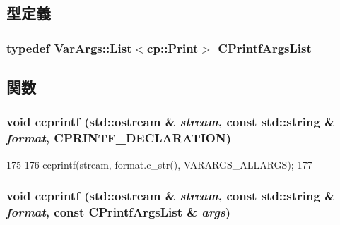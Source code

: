 \subsection{型定義}
\hypertarget{cprintf_8hh_a172a676df3b19060341a2bf04a85d39f}{
\subsubsection[{CPrintfArgsList}]{\setlength{\rightskip}{0pt plus 5cm}typedef {\bf VarArgs::List}$<${\bf cp::Print}$>$ {\bf CPrintfArgsList}}}
\label{cprintf_8hh_a172a676df3b19060341a2bf04a85d39f}


\subsection{関数}
\hypertarget{cprintf_8hh_a37efa0e15ccd2c46e909b8d16241c74a}{
\subsubsection[{ccprintf}]{\setlength{\rightskip}{0pt plus 5cm}void ccprintf (std::ostream \& {\em stream}, \/  const std::string \& {\em format}, \/  CPRINTF\_\-DECLARATION)}}
\label{cprintf_8hh_a37efa0e15ccd2c46e909b8d16241c74a}



\begin{DoxyCode}
175 {
176     ccprintf(stream, format.c_str(), VARARGS_ALLARGS);
177 }
\end{DoxyCode}
\hypertarget{cprintf_8hh_aa5d0d153481b44d3d471551d41fd0fe3}{
\subsubsection[{ccprintf}]{\setlength{\rightskip}{0pt plus 5cm}void ccprintf (std::ostream \& {\em stream}, \/  const std::string \& {\em format}, \/  const {\bf CPrintfArgsList} \& {\em args})}}
\label{cprintf_8hh_aa5d0d153481b44d3d471551d41fd0fe3}



